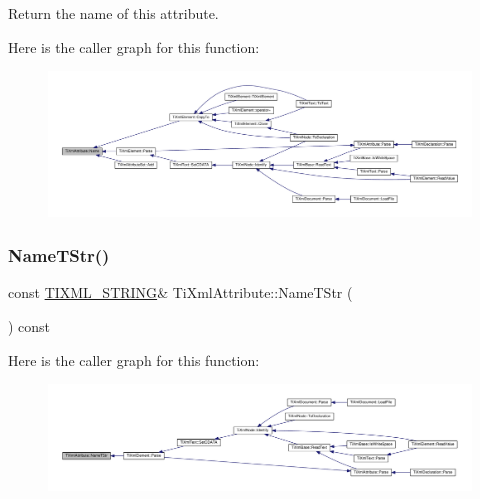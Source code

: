 Return the name of this attribute. 

Here is the caller graph for this function\+:\nopagebreak
\begin{figure}[H]
\begin{center}
\leavevmode
\includegraphics[width=350pt]{class_ti_xml_attribute_a008ef948268ee752b58c60d63d84bb01_icgraph}
\end{center}
\end{figure}
\mbox{\label{class_ti_xml_attribute_a2bd49ec37463a0a2d081e6587f8b89b8}} 
\subsubsection{\texorpdfstring{Name\+T\+Str()}{NameTStr()}}
{\footnotesize\ttfamily const \hyperlink{tinyxml_8h_a92bada05fd84d9a0c9a5bbe53de26887}{T\+I\+X\+M\+L\+\_\+\+S\+T\+R\+I\+NG}\& Ti\+Xml\+Attribute\+::\+Name\+T\+Str (\begin{DoxyParamCaption}{ }\end{DoxyParamCaption}) const\hspace{0.3cm}{\ttfamily [inline]}}

Here is the caller graph for this function\+:\nopagebreak
\begin{figure}[H]
\begin{center}
\leavevmode
\includegraphics[width=350pt]{class_ti_xml_attribute_a2bd49ec37463a0a2d081e6587f8b89b8_icgraph}
\end{center}
\end{figure}
\mbox{\label{class_ti_xml_attribute_af2e78f1ba9ed56a26ddc80614ed1c393}} 
